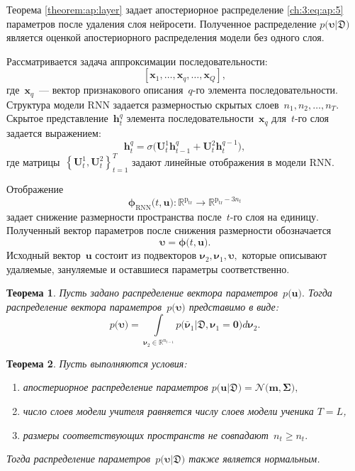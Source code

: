 \documentclass{dissert}
\newtheorem{theorem}{Теорема}
\begin{document}
Теорема \ref{theorem:ap:layer} задает апостериорное распределение \eqref{ch:3:eq:ap:5} параметров после удаления слоя нейросети. Полученное распределение $p\bigr(\bm{\upsilon}|\mathfrak{D}\bigr) $ является оценкой апостериорного распределения модели без одного слоя.

Рассматривается задача аппроксимации последовательности:
\[
    \left[\mathbf{x}_1, \ldots, \mathbf{x}_{q}, \ldots, \mathbf{x}_{Q}\right],
\]
где~$\mathbf{x}_{q}$~--- вектор признакового описания~$q$-го элемента последовательности. 
Структура модели RNN задается размерностью скрытых слоев~$n_1, n_2, \ldots, n_T.$ Скрытое представление~$\mathbf{h}^{q}_t$ элемента последовательности~$\mathbf{x}_{q}$ для~$t$-го слоя задается выражением:
\[
    \mathbf{h}^{q}_t = \sigma\bigr(\mathbf{U}^{1}_{t}\mathbf{h}^{q}_{t-1}+\mathbf{U}^{2}_{t}\mathbf{h}^{q-1}_{t}\bigr),
\]
где матрицы~$\left\{\mathbf{U}^{1}_{t}, \mathbf{U}^{2}_{t}\right\}_{t=1}^{T}$ задают линейные отображения в модели RNN.

Отображение
\[
\bm{\phi}_{\text{RNN}}\bigr(t, \mathbf{u}\bigr) : \mathbb{R}^{\text{p}_{\text{tr}}} \to \mathbb{R}^{\text{p}_{\text{tr}}-3n_t}
\]
задает снижение размерности пространства после~$t$-го слоя на единицу. Полученный вектор параметров после снижения размерности обозначается
\[
\bm{\upsilon} = \bm{\phi}\bigr(t, \mathbf{u}\bigr).
\]
Исходный вектор~$\mathbf{u}$ состоит из подвекторов $\bm{\nu}_2, {\bm{\nu}}_1, \bm{\upsilon},$ которые описывают удаляемые, зануляемые и оставшиеся параметры соответственно.

\begin{theorem}
Пусть задано распределение вектора параметров~$p\bigr(\mathbf{u}\bigr).$ Тогда распределение вектора параметров~$p\bigr(\bm{\upsilon}\bigr)$ представимо в виде:
\[
p\bigr(\bm{\upsilon}\bigr)  = \int\limits_{ \bm{\nu}_2 \in \mathbb{R}^{n_{t-1}}}p\bigr(\bar{\bm{\nu}}_1|\mathfrak{D}, \bm{\nu}_1=\mathbf{0}\bigr) d \bm{\nu}_2.
\]
\end{theorem}

\begin{theorem}
Пусть выполняются условия:
\begin{enumerate}
\item[1)] апостериорное распределение параметров $p\bigr(\mathbf{u}|\mathfrak{D}\bigr) = \mathcal{N}\bigr(\mathbf{m}, \bm{\Sigma}\bigr),$
\item[2)] число слоев модели учителя равняется числу слоев модели ученика $T=L$,
\item[3)] размеры соответствующих пространств не совпадают~$n_t \geq n_t.$
\end{enumerate}
Тогда распределение параметров~$p\bigr(\bm{\upsilon}|\mathfrak{D}\bigr)$ также является нормальным.
\end{theorem}
\end{document}
